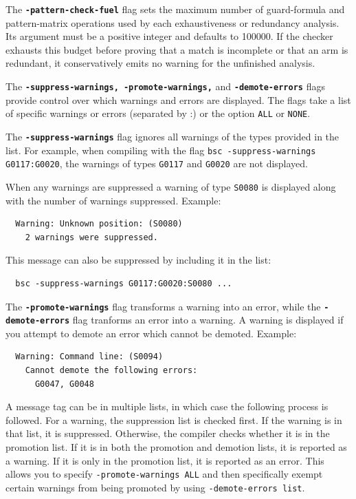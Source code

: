 \documentclass{article}
\newcommand{\te}[1]{\texttt{#1}}
\begin{document}
The {\bf\tt -pattern-check-fuel} flag sets the maximum number of
guard-formula and pattern-matrix operations used by each exhaustiveness or
redundancy analysis.  Its argument must be a positive integer and defaults to
100000.  If the checker exhausts this budget before proving that a match is
incomplete or that an arm is redundant, it conservatively emits no warning
for the unfinished analysis.

The {\bf\tt -suppress-warnings, -promote-warnings,} and {\bf\tt -demote-errors} flags provide control over which
warnings and errors are displayed.  The flags take a list of specific  warnings
or errors  (separated by :) or  the option
\te{ALL} or \te{NONE}.

The {\bf\tt -suppress-warnings} flag
ignores all warnings of the types provided in the list.  
For example, when compiling with the flag \te{bsc -suppress-warnings
G0117:G0020},  the warnings  of types \te{G0117} and \te{G0020} 
are not  displayed.  

When any warnings are suppressed a warning of type \te{S0080} is
displayed along with the number of warnings suppressed.  Example:

\begin{verbatim}
  Warning: Unknown position: (S0080)
    2 warnings were suppressed.
\end{verbatim}

This message can also be suppressed by including it in the list:

\begin{verbatim}
  bsc -suppress-warnings G0117:G0020:S0080 ...
\end{verbatim}

The {\bf\tt -promote-warnings} flag transforms a warning into an
error, while the {\bf\tt -demote-errors} flag tranforms an error into
a warning.   A warning is displayed if you attempt to demote an error
which cannot be demoted.  Example:

\begin{verbatim}
  Warning: Command line: (S0094)
    Cannot demote the following errors:
      G0047, G0048 
\end{verbatim}

A message tag can be in multiple lists, in which case the following
process is followed.  For a warning, the suppression list is checked
first.  If the warning is in that list, it is suppressed.  Otherwise,
the compiler checks whether it is in the promotion list.  If it
is in both the promotion and demotion lists, it is reported as a
warning.  If it is only in the promotion list, it is reported as an
error.  This allows you to specify \te{-promote-warnings ALL} and then
specifically exempt certain warnings from being promoted by using
\te{-demote-errors list}.
\end{document}
